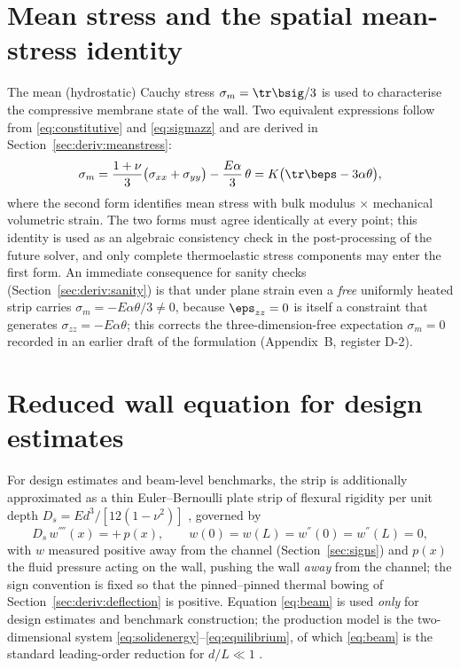 \section{Mean stress and the spatial mean-stress identity}
\label{sec:meanstress}
The mean (hydrostatic) Cauchy stress $\sigma_m=\tr\bsig/3$ is used to characterise the compressive
membrane state of the wall. Two equivalent expressions follow from \eqref{eq:constitutive} and
\eqref{eq:sigmazz} and are derived in Section~\ref{sec:deriv:meanstress}:
\begin{equation}
\sigma_m=\frac{1+\nu}{3}\big(\sigma_{xx}+\sigma_{yy}\big)-\frac{E\alpha}{3}\,\theta
=K\big(\tr\beps-3\alpha\theta\big),
\label{eq:meanstress}
\end{equation}
where the second form identifies mean stress with bulk modulus $\times$ mechanical volumetric
strain. The two forms must agree identically at every point; this identity is used as an algebraic
consistency check in the post-processing of the future solver, and only complete thermoelastic
stress components may enter the first form. An immediate consequence for sanity checks
(Section~\ref{sec:deriv:sanity}) is that under plane strain even a \emph{free} uniformly heated
strip carries $\sigma_m=-E\alpha\theta/3\neq0$, because $\eps_{zz}=0$ is itself a constraint that
generates $\sigma_{zz}=-E\alpha\theta$; this corrects the three-dimension-free expectation
$\sigma_m=0$ recorded in an earlier draft of the formulation (Appendix~B, register D-2).

\section{Reduced wall equation for design estimates}
\label{sec:beam}
For design estimates and beam-level benchmarks, the strip is additionally approximated as a thin
Euler--Bernoulli plate strip of flexural rigidity per unit depth
$D_s=Ed^3/[12(1-\nu^2)]$ \cite{timoshenko1970elasticity}, governed by
\begin{equation}
D_s\,w^{''''}(x)= +\,p(x), \qquad
w(0)=w(L)=w^{''}(0)=w^{''}(L)=0,
\label{eq:beam}
\end{equation}
with $w$ measured positive away from the channel (Section~\ref{sec:signs}) and $p(x)$ the fluid pressure
acting on the wall, pushing the wall \emph{away} from the channel; the sign convention is fixed so
that the pinned--pinned thermal bowing of Section~\ref{sec:deriv:deflection} is positive.
Equation \eqref{eq:beam} is used \emph{only} for design estimates and benchmark construction; the
production model is the two-dimensional system \eqref{eq:solidenergy}--\eqref{eq:equilibrium}, of
which \eqref{eq:beam} is the standard leading-order reduction for $d/L\ll1$
\cite{timoshenko1970elasticity}.

